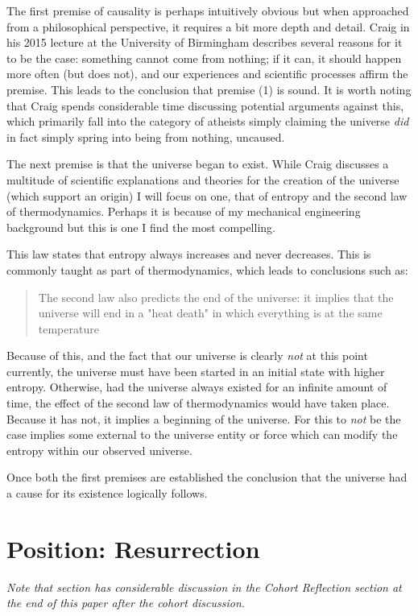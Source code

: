 \documentclass[12pt]{turabian-researchpaper}
\begin{document}
The first premise of causality is perhaps intuitively obvious but when approached from a philosophical perspective, it requires a bit more depth and detail. Craig in his 2015 lecture at the University of Birmingham describes several reasons for it to be the case: something cannot come from nothing; if it can, it should happen more often (but does not), and our experiences and scientific processes affirm the premise.\autocite{craig2015} This leads to the conclusion that premise (1) is sound. It is worth noting that Craig spends considerable time discussing potential arguments against this, which primarily fall into the category of atheists simply claiming the universe \textit{did} in fact simply spring into being from nothing, uncaused.

The next premise is that the universe began to exist. While Craig discusses a multitude of scientific explanations and theories for the creation of the universe (which support an origin) I will focus on one, that of entropy and the second law of thermodynamics. Perhaps it is because of my mechanical engineering background but this is one I find the most compelling.

This law states that entropy always increases and never decreases. This is commonly taught as part of thermodynamics, which leads to conclusions such as:\autocite{duffy1999}

\begin{quotation}
The second law also predicts the end of the universe: it implies that the universe will end in a "heat death" in which everything is at the same temperature
\end{quotation}

Because of this, and the fact that our universe is clearly \textit{not} at this point currently, the universe must have been started in an initial state with higher entropy. Otherwise, had the universe always existed for an infinite amount of time, the effect of the second law of thermodynamics would have taken place. Because it has not, it implies a beginning of the universe. For this to \textit{not} be the case implies some external to the universe entity or force which can modify the entropy within our observed universe.

Once both the first premises are established the conclusion that the universe had a cause for its existence logically follows.

\section{Position: Resurrection} 
\textit{Note that  section has considerable discussion in the Cohort Reflection section at the end of this paper after the cohort discussion.}
\end{document}

